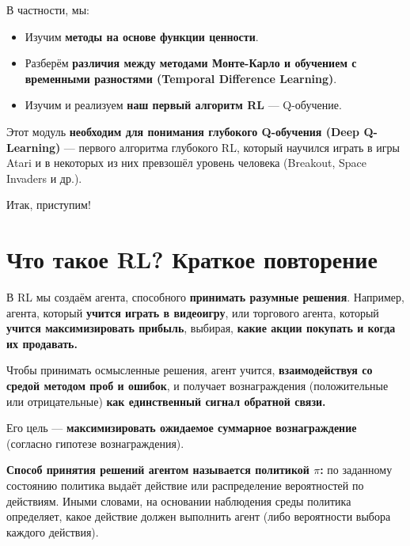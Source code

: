 \documentclass[11pt,a4paper]{article}
\begin{document}
В частности, мы:

\begin{itemize}
\tightlist
\item
  Изучим \textbf{методы на основе функции ценности}.
\item
  Разберём \textbf{различия между методами Монте-Карло и обучением с временными разностями (Temporal Difference Learning)}.
\item
  Изучим и реализуем \textbf{наш первый алгоритм RL} --- Q-обучение.
\end{itemize}

Этот модуль \textbf{необходим для понимания глубокого Q-обучения (Deep Q-Learning)} --- первого алгоритма глубокого RL, который научился играть в игры Atari и в некоторых из них превзошёл уровень человека (Breakout, Space Invaders и др.).

Итак, приступим!

\section{Что такое RL? Краткое повторение}\label{what-is-rl-a-short-recap}

В RL мы создаём агента, способного \textbf{принимать разумные решения}. Например, агента, который \textbf{учится играть в видеоигру}, или торгового агента, который \textbf{учится максимизировать прибыль}, выбирая, \textbf{какие акции покупать и когда их продавать.}


Чтобы принимать осмысленные решения, агент учится, \textbf{взаимодействуя со средой методом проб и ошибок}, и получает вознаграждения (положительные или отрицательные) \textbf{как единственный сигнал обратной связи.}

Его цель --- \textbf{максимизировать ожидаемое суммарное вознаграждение} (согласно гипотезе вознаграждения).

\textbf{Способ принятия решений агентом называется политикой \(\pi\):} по заданному состоянию политика выдаёт действие или распределение вероятностей по действиям. Иными словами, на основании наблюдения среды политика определяет, какое действие должен выполнить агент (либо вероятности выбора каждого действия).

\end{document}
